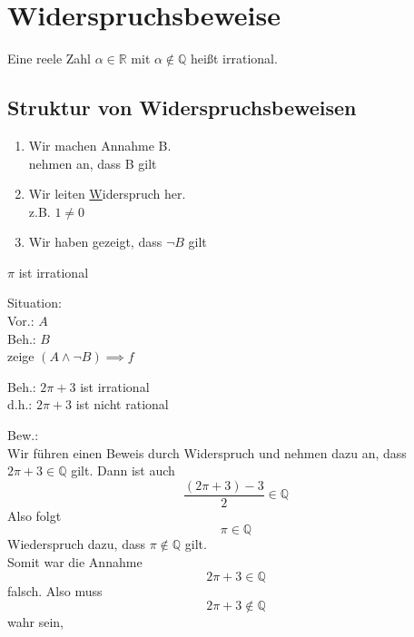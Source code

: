 \documentclass[a4paper, parskip = true, fleqn, headsepline = true]{scrartcl}
\newcommand{\qed}{\tag{$\square$}}
\DeclareRobustCommand{\qed}{%
	\ifmmode \tag*{$\square$}%
	\else \leavevmode\unskip\penalty9999 \hbox{}\nobreak\hfill\quad\hbox{$\square$}%
	\fi%
}
\begin{document}
\section{Widerspruchsbeweise}
\begin{definition}
	\label{def:IrrationaleZahlen}
	Eine reele Zahl $ \alpha \in \mathbb{R} $ mit $ \alpha \notin \mathbb{Q} $ heißt irrational.
\end{definition}

\subsection{Struktur von Widerspruchsbeweisen}
\begin{enumerate}
	\item Wir machen Annahme B.\\
		nehmen an, dass B gilt
	\item Wir leiten \underline Widerspruch her.\\
		z.B. $ 1 \neq 0 $\\
	\item Wir haben gezeigt, dass $ \neg B $ gilt
\end{enumerate}

\begin{subtheorem}
	\label{theorem:PiIstIrrational}
	$ \pi $ ist irrational
\end{subtheorem}
\begin{subproof}
	Situation:\\
	Vor.: $A$ \\
	Beh.: $B$ \\
	zeige $ ( A \wedge \neg B ) \implies f $\par
	Beh.: $ 2 \pi + 3 $ ist irrational\\
	d.h.: $ 2 \pi + 3 $ ist nicht rational\par
	Bew.:\\
	Wir führen einen Beweis durch Widerspruch und nehmen dazu an, dass $ 2 \pi + 3 \in \mathbb{Q} $ gilt. Dann ist auch
	\[ \frac{ ( 2 \pi + 3 ) - 3 }{ 2 } \in \mathbb{Q} \]
	Also folgt
	\[ \pi \in \mathbb{Q} \]
	Wiederspruch dazu, dass $ \pi \notin \mathbb{Q} $ gilt.\\
	Somit war die Annahme
	\[ 2 \pi + 3 \in \mathbb{Q} \]
	falsch. Also muss
	\[ 2 \pi + 3 \notin \mathbb{Q} \]
	wahr sein, \qed
\end{subproof}
\end{document}
